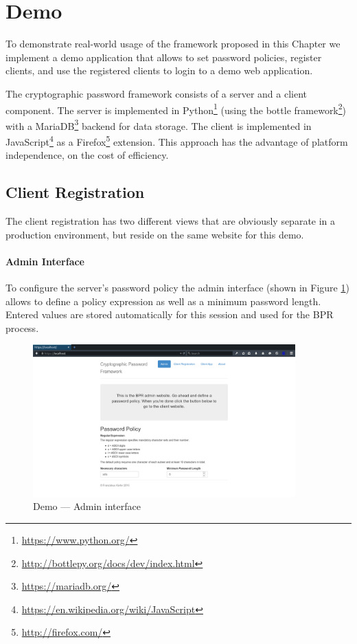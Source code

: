 \section{Demo} \label{sec:vpake-demo}

To demonstrate real-world usage of the framework proposed in this Chapter we implement a demo application that allows to set password policies, register clients, and use the registered clients to login to a demo web application.

The cryptographic password framework consists of a server and a client component.
The server is implemented in Python\footnote{\url{https://www.python.org/}} (using the bottle framework\footnote{\url{http://bottlepy.org/docs/dev/index.html}}) with a MariaDB\footnote{\url{https://mariadb.org/}} backend for data storage.
The client is implemented in JavaScript\footnote{\url{https://en.wikipedia.org/wiki/JavaScript}} as a Firefox\footnote{\url{http://firefox.com/}} extension.
This approach has the advantage of platform independence, on the cost of efficiency.

\subsection{Client Registration}
The client registration has two different views that are obviously separate in a production environment, but reside on the same website for this demo.

\paragraph{Admin Interface}
To configure the server's password policy the admin interface (shown in Figure \ref{fig:demo-admin}) allows to define a policy expression as well as a minimum password length.
Entered values are stored automatically for this session and used for the \ac{BPR} process.

\begin{figure}[tbph]
\centering
\includegraphics[width=0.9\textwidth]{Figs/demo-admin.png}
\caption{Demo --- Admin interface}\label{fig:demo-admin}
\end{figure}

